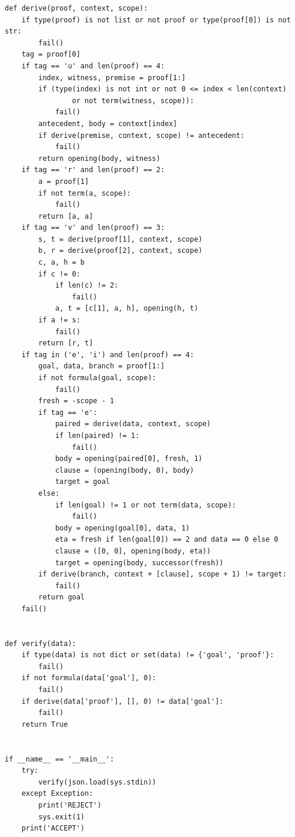 \documentclass[11pt,letterpaper]{article}
\theoremstyle{definition}
\begin{document}
\begin{lstlisting}
def derive(proof, context, scope):
    if type(proof) is not list or not proof or type(proof[0]) is not str:
        fail()
    tag = proof[0]
    if tag == 'u' and len(proof) == 4:
        index, witness, premise = proof[1:]
        if (type(index) is not int or not 0 <= index < len(context)
                or not term(witness, scope)):
            fail()
        antecedent, body = context[index]
        if derive(premise, context, scope) != antecedent:
            fail()
        return opening(body, witness)
    if tag == 'r' and len(proof) == 2:
        a = proof[1]
        if not term(a, scope):
            fail()
        return [a, a]
    if tag == 'v' and len(proof) == 3:
        s, t = derive(proof[1], context, scope)
        b, r = derive(proof[2], context, scope)
        c, a, h = b
        if c != 0:
            if len(c) != 2:
                fail()
            a, t = [c[1], a, h], opening(h, t)
        if a != s:
            fail()
        return [r, t]
    if tag in ('e', 'i') and len(proof) == 4:
        goal, data, branch = proof[1:]
        if not formula(goal, scope):
            fail()
        fresh = -scope - 1
        if tag == 'e':
            paired = derive(data, context, scope)
            if len(paired) != 1:
                fail()
            body = opening(paired[0], fresh, 1)
            clause = (opening(body, 0), body)
            target = goal
        else:
            if len(goal) != 1 or not term(data, scope):
                fail()
            body = opening(goal[0], data, 1)
            eta = fresh if len(goal[0]) == 2 and data == 0 else 0
            clause = ([0, 0], opening(body, eta))
            target = opening(body, successor(fresh))
        if derive(branch, context + [clause], scope + 1) != target:
            fail()
        return goal
    fail()


def verify(data):
    if type(data) is not dict or set(data) != {'goal', 'proof'}:
        fail()
    if not formula(data['goal'], 0):
        fail()
    if derive(data['proof'], [], 0) != data['goal']:
        fail()
    return True


if __name__ == '__main__':
    try:
        verify(json.load(sys.stdin))
    except Exception:
        print('REJECT')
        sys.exit(1)
    print('ACCEPT')
\end{lstlisting}
\end{document}
